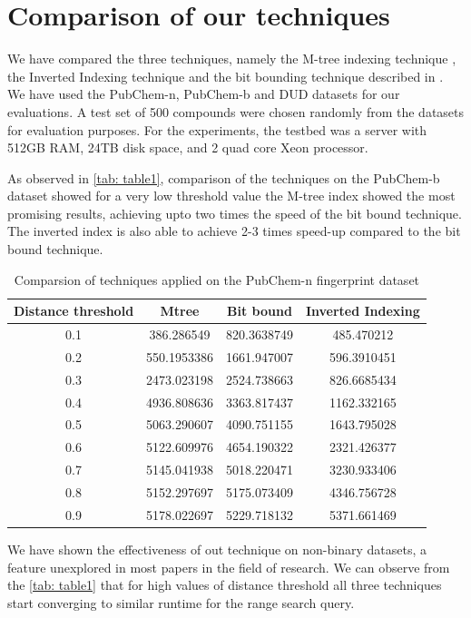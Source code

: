 \section{Comparison of our techniques}

We have compared the three techniques, namely the M-tree indexing technique , the Inverted Indexing technique and the bit bounding technique described in \citet*{swamidass2007bounds}. We have used the PubChem-n, PubChem-b and DUD datasets for our evaluations. A test set of 500 compounds were chosen randomly from the datasets for evaluation purposes. For the experiments, the testbed was a server with 512GB RAM, 24TB disk space, and 2 quad core Xeon processor. 

As observed in \autoref{tab: table1}, comparison of the techniques on the PubChem-b dataset showed for a very low threshold value the M-tree index showed the most promising results, achieving upto two times the speed of the bit bound technique. The inverted index is also able to achieve 2-3 times speed-up compared to the bit bound technique. \\



\begin{table}[ht]
\centering
\caption{Comparsion of techniques applied on the PubChem-n fingerprint dataset}
\label{tab: table1}
\begin{tabular}{|c|c|c|c|}
\hline 
Distance threshold & Mtree	& Bit bound	& 	Inverted Indexing \\
\hline
0.1	& 	386.286549	& 820.3638749	&	485.470212\\
0.2	& 	550.1953386	& 1661.947007	&	596.3910451\\
0.3	& 	2473.023198	& 2524.738663	&	826.6685434\\
0.4	& 	4936.808636	& 3363.817437	&	1162.332165\\
0.5	& 	5063.290607	& 4090.751155	&	1643.795028\\
0.6	& 	5122.609976	& 4654.190322	&	2321.426377\\
0.7	& 	5145.041938	& 5018.220471	&	3230.933406\\
0.8	& 	5152.297697	& 5175.073409	&	4346.756728\\
0.9	& 	5178.022697	& 5229.718132	&	5371.661469\\
\hline 
\end{tabular} 
\end{table}

We have shown the effectiveness of out technique on non-binary datasets, a feature unexplored in most papers in the field of research. We can observe from the \autoref{tab: table1} that for high values of distance threshold all three techniques start converging to similar runtime for the range search query. \\

